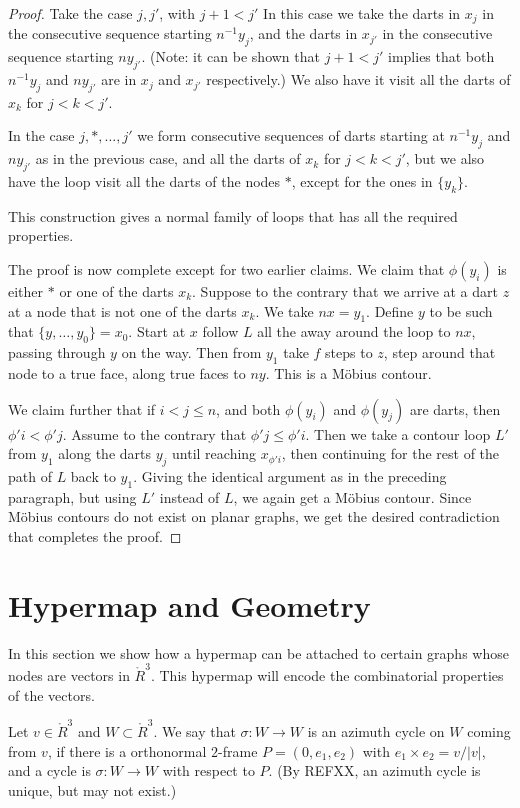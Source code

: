 \begin{proof}
Take the case $j,j'$, with $j+1<j'$ In this case we take the darts
in $x_j$ in the consecutive sequence starting $n^{-1} y_j$, and the
darts in $x_{j'}$ in the consecutive sequence starting $n y_{j'}$.
(Note: it can be shown that $j+1 < j'$ implies that both $n^{-1}
y_j$ and $n y_{j'}$ are in $x_j$ and $x_{j'}$ respectively.) We also
have it visit all the darts of $x_k$ for $j<k<j'$.

In the case $j,*,\ldots,j'$ we form consecutive sequences of darts
starting at $n^{-1} y_j$ and $n y_{j'}$ as in the previous case, and
all the darts of $x_k$ for $j<k<j'$, but we also have the loop visit
all the darts of the nodes $*$, except for the ones in $\{y_k\}$.

This construction gives a normal family of loops that has all the
required properties.

The proof is now complete except for two earlier claims.  We claim
that $\phi(y_i)$ is either $*$ or one of the darts $x_k$.  Suppose
to the contrary that we arrive at a dart $z$ at a node that is not
one of the darts $x_k$.  We take $n x = y_1$.  Define $y$ to be such
that $\{y,\ldots,y_0\} = x_0$. Start at $x$ follow $L$ all the away
around the loop to $n x$, passing through $y$ on the way.  Then from
$y_1$ take $f$ steps to $z$, step around that node to a true face,
along true faces to $n y$.  This is a M\"obius contour.

We claim further that if $i<j\le n$, and both $\phi(y_i)$ and
$\phi(y_j)$ are darts, then $\phi' i < \phi' j$.  Assume to the
contrary that $\phi' j \le \phi' i$.  Then we take a contour loop
$L'$ from $y_1$ along the darts $y_j$ until reaching $x_{\phi' i}$,
then continuing for the rest of the path of $L$ back to $y_1$.
Giving the identical argument as in the preceding paragraph, but
using $L'$ instead of $L$, we again get a M\"obius contour.  Since
M\"obius contours do not exist on planar graphs, we get the desired
contradiction that completes the proof.
\end{proof}

\chapter{Hypermap and Geometry}

In this section we show how a hypermap can be attached to certain
graphs whose nodes are vectors in $\ring{R}^3$. This hypermap will
encode the combinatorial properties of the vectors.

\begin{definition}  Let $v\in\ring{R}^3$ and $W \subset
\ring{R}^3$.  We say that $\sigma:W\to W$ is an azimuth cycle on $W$
coming from $v$, if there is a orthonormal $2$-frame $P=(0,e_1,e_2)$
with $e_1 \times e_2 = v/|v|$, and a cycle is $\sigma:W\to W$ with
respect to $P$. (By REFXX, an azimuth cycle is unique, but may not
exist.)
\end{definition}


